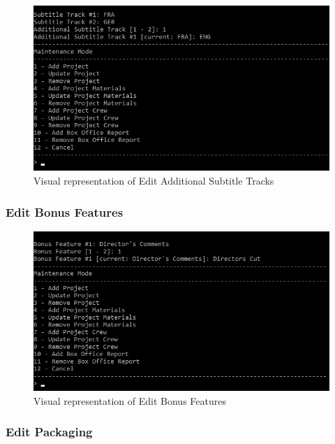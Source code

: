 \documentclass[
  english,
  a4paper,
,tablecaptionabove
]{scrartcl}
\begin{document}
\begin{figure}
\centering
\includegraphics{images/ui-screenshots/update-project-material-additional-subtitle-tracks.png}
\caption{Visual representation of Edit Additional Subtitle Tracks}
\end{figure}

\newpage

\hypertarget{edit-bonus-features}{%
\subsubsection{Edit Bonus Features}\label{edit-bonus-features}}

\begin{figure}
\centering
\includegraphics{images/ui-screenshots/update-project-material-bonus-feature.png}
\caption{Visual representation of Edit Bonus Features}
\end{figure}

\newpage

\hypertarget{edit-packaging}{%
\subsubsection{Edit Packaging}\label{edit-packaging}}
\end{document}
